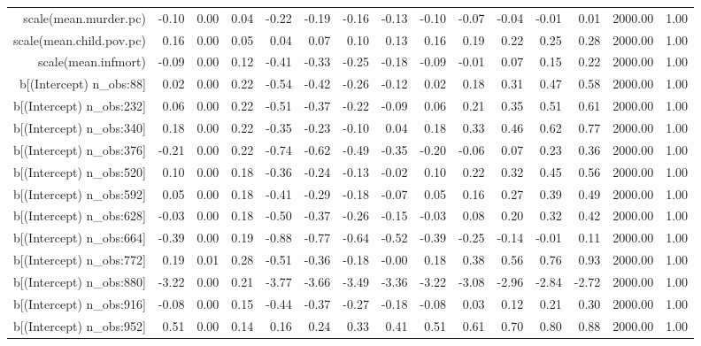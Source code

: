 \begin{table}[ht]
\begin{tabular}{rrrrrrrrrrrrrrr}
  scale(mean.murder.pc) & -0.10 & 0.00 & 0.04 & -0.22 & -0.19 & -0.16 & -0.13 & -0.10 & -0.07 & -0.04 & -0.01 & 0.01 & 2000.00 & 1.00 \\ 
  scale(mean.child.pov.pc) & 0.16 & 0.00 & 0.05 & 0.04 & 0.07 & 0.10 & 0.13 & 0.16 & 0.19 & 0.22 & 0.25 & 0.28 & 2000.00 & 1.00 \\ 
  scale(mean.infmort) & -0.09 & 0.00 & 0.12 & -0.41 & -0.33 & -0.25 & -0.18 & -0.09 & -0.01 & 0.07 & 0.15 & 0.22 & 2000.00 & 1.00 \\ 
  b[(Intercept) n\_obs:88] & 0.02 & 0.00 & 0.22 & -0.54 & -0.42 & -0.26 & -0.12 & 0.02 & 0.18 & 0.31 & 0.47 & 0.58 & 2000.00 & 1.00 \\ 
  b[(Intercept) n\_obs:232] & 0.06 & 0.00 & 0.22 & -0.51 & -0.37 & -0.22 & -0.09 & 0.06 & 0.21 & 0.35 & 0.51 & 0.61 & 2000.00 & 1.00 \\ 
  b[(Intercept) n\_obs:340] & 0.18 & 0.00 & 0.22 & -0.35 & -0.23 & -0.10 & 0.04 & 0.18 & 0.33 & 0.46 & 0.62 & 0.77 & 2000.00 & 1.00 \\ 
  b[(Intercept) n\_obs:376] & -0.21 & 0.00 & 0.22 & -0.74 & -0.62 & -0.49 & -0.35 & -0.20 & -0.06 & 0.07 & 0.23 & 0.36 & 2000.00 & 1.00 \\ 
  b[(Intercept) n\_obs:520] & 0.10 & 0.00 & 0.18 & -0.36 & -0.24 & -0.13 & -0.02 & 0.10 & 0.22 & 0.32 & 0.45 & 0.56 & 2000.00 & 1.00 \\ 
  b[(Intercept) n\_obs:592] & 0.05 & 0.00 & 0.18 & -0.41 & -0.29 & -0.18 & -0.07 & 0.05 & 0.16 & 0.27 & 0.39 & 0.49 & 2000.00 & 1.00 \\ 
  b[(Intercept) n\_obs:628] & -0.03 & 0.00 & 0.18 & -0.50 & -0.37 & -0.26 & -0.15 & -0.03 & 0.08 & 0.20 & 0.32 & 0.42 & 2000.00 & 1.00 \\ 
  b[(Intercept) n\_obs:664] & -0.39 & 0.00 & 0.19 & -0.88 & -0.77 & -0.64 & -0.52 & -0.39 & -0.25 & -0.14 & -0.01 & 0.11 & 2000.00 & 1.00 \\ 
  b[(Intercept) n\_obs:772] & 0.19 & 0.01 & 0.28 & -0.51 & -0.36 & -0.18 & -0.00 & 0.18 & 0.38 & 0.56 & 0.76 & 0.93 & 2000.00 & 1.00 \\ 
  b[(Intercept) n\_obs:880] & -3.22 & 0.00 & 0.21 & -3.77 & -3.66 & -3.49 & -3.36 & -3.22 & -3.08 & -2.96 & -2.84 & -2.72 & 2000.00 & 1.00 \\ 
  b[(Intercept) n\_obs:916] & -0.08 & 0.00 & 0.15 & -0.44 & -0.37 & -0.27 & -0.18 & -0.08 & 0.03 & 0.12 & 0.21 & 0.30 & 2000.00 & 1.00 \\ 
  b[(Intercept) n\_obs:952] & 0.51 & 0.00 & 0.14 & 0.16 & 0.24 & 0.33 & 0.41 & 0.51 & 0.61 & 0.70 & 0.80 & 0.88 & 2000.00 & 1.00 \\ 

\end{tabular}
\end{table}

